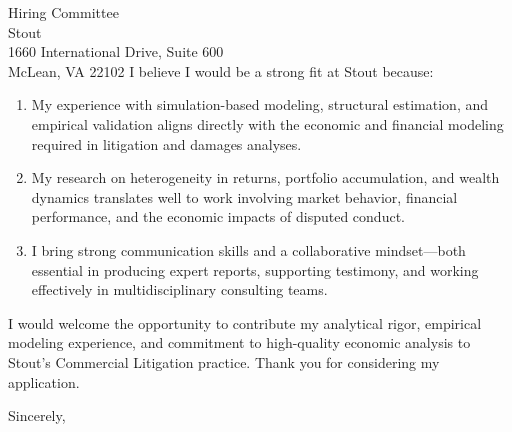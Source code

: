 \documentclass[11pt,letterpaper]{letter}
\begin{document}
\begin{letter}{Hiring Committee \\
Stout \\
1660 International Drive, Suite 600 \\
McLean, VA 22102}
I believe I would be a strong fit at Stout because:
\begin{enumerate}
    \item My experience with simulation-based modeling, structural estimation, and empirical validation aligns directly with the economic and financial modeling required in litigation and damages analyses.
    \item My research on heterogeneity in returns, portfolio accumulation, and wealth dynamics translates well to work involving market behavior, financial performance, and the economic impacts of disputed conduct.
    \item I bring strong communication skills and a collaborative mindset—both essential in producing expert reports, supporting testimony, and working effectively in multidisciplinary consulting teams.
\end{enumerate}

I would welcome the opportunity to contribute my analytical rigor, empirical modeling experience, and commitment to high-quality economic analysis to Stout’s Commercial Litigation practice. Thank you for considering my application.

\closing{Sincerely,}

\end{letter}
\end{document}
